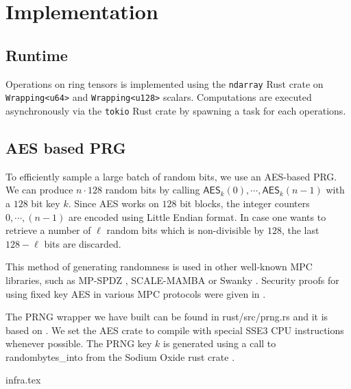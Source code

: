 \section{Implementation}


\subsection{Runtime}

Operations on ring tensors is implemented using the \texttt{ndarray} Rust crate on
\texttt{Wrapping<u64>} and \texttt{Wrapping<u128>} scalars. Computations are executed
asynchronously via the \texttt{tokio} Rust crate by spawning a task for each operations.


\subsection{AES based PRG}
\label{sec:aes}

To efficiently sample a large batch of random bits, we use an AES-based PRG. We can produce $n \cdot 128$ random bits by calling $\mathsf{AES}_k(0), \cdots, \mathsf{AES}_k(n-1)$ with a $128$ bit key $k$. 
Since AES works on $128$ bit blocks, the integer counters $0, \cdots, (n-1)$
are encoded using Little Endian format. In case one wants to retrieve a
number of $\ell$ random bits which is non-divisible by $128$, the last
$128 - \ell$ bits are discarded.

This method of generating
randomness is used in other well-known MPC libraries, such as MP-SPDZ
\cite{CCS:Keller20}, SCALE-MAMBA \cite{SCALE} or Swanky \cite{url-swanky}.
Security proofs for using fixed key AES in various MPC protocols were given
in \cite{SP:GKWY20}.

The PRNG wrapper we have built can be found in \textsf{rust/src/prng.rs} and
it is based on \cite{url-cargo-aes}.  We set the \textsf{AES} crate to
compile with special SSE3 CPU instructions whenever possible.
The PRNG key $k$ is generated using a call to \textsf{randombytes\_into}
from the Sodium Oxide rust crate \cite{url-sodiumoxide}.


{infra.tex}
